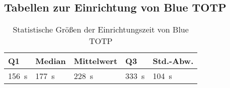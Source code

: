 \subsection{Tabellen zur Einrichtung von Blue TOTP}
\label{anh: studie ergebnisse setup}

\begin{table}
    \centering
    \begin{center}
    \begin{tabular}{| l | l | l | l | l |}
        \hline
        \textbf{Q1} & \textbf{Median} & \textbf{Mittelwert} & \textbf{Q3} & \textbf{Std.-Abw.} \\
        \hline
        156~s & 177~s & 228~s & 333~s & 104~s \\  
        \hline
    \end{tabular}
    \end{center}
    \caption[Statistische Größen der Einrichtungszeit von Blue TOTP]{Statistische Größen der Einrichtungszeit von Blue TOTP}
    \label{tab: studie setup time}
\end{table}

